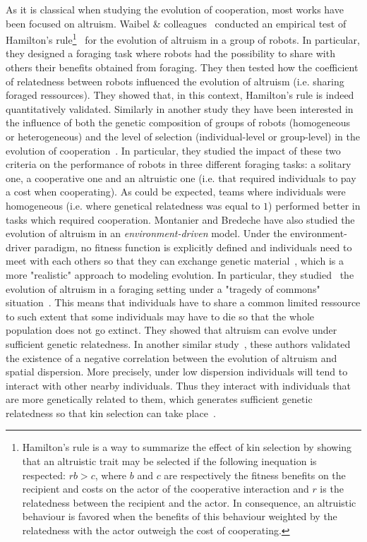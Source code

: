         As it is classical when studying the evolution of cooperation, most works have been focused on altruism. Waibel \& colleagues~\parencite{Waibel2011} conducted an empirical test of Hamilton's rule\footnote{Hamilton's rule is a way to summarize the effect of kin selection by showing that an altruistic trait may be selected if the following inequation is respected: $rb > c$, where $b$ and $c$ are respectively the fitness benefits on the recipient and costs on the actor of the cooperative interaction and $r$ is the relatedness between the recipient and the actor. In consequence, an altruistic behaviour is favored when the benefits of this behaviour weighted by the relatedness with the actor outweigh the cost of cooperating.}~\parencite{Hamilton1964} for the evolution of altruism in a group of robots. In particular, they designed a foraging task where robots had the possibility to share with others their benefits obtained from foraging. They then tested how the coefficient of relatedness between robots influenced the evolution of altruism (i.e. sharing foraged ressources). They showed that, in this context, Hamilton's rule is indeed quantitatively validated. Similarly in another study they have been interested in the influence of both the genetic composition of groups of robots (homogeneous or heterogeneous) and the level of selection (individual-level or group-level) in the evolution of cooperation~\parencite{Waibel2009}. In particular, they studied the impact of these two criteria on the performance of robots in three different foraging tasks: a solitary one, a cooperative one and an altruistic one (i.e. that required individuals to pay a cost when cooperating). As could be expected, teams where individuals were homogeneous (i.e. where genetical relatedness was equal to $1$) performed better in tasks which required cooperation. Montanier and Bredeche have also studied the evolution of altruism in an \emph{environment-driven} model. Under the environment-driver paradigm, no fitness function is explicitly defined and individuals need to meet with each others so that they can exchange genetic material~\parencite{Bredeche2010}, which is a more "realistic" approach to modeling evolution. In particular, they studied~\parencite{Montanier2011} the evolution of altruism in a foraging setting under a "tragedy of commons" situation~\parencite{Hardin1968}. This means that individuals have to share a common limited ressource to such extent that some individuals may have to die so that the whole population does not go extinct. They showed that altruism can evolve under sufficient genetic relatedness. In another similar study~\parencite{Montanier2013}, these authors validated the existence of a negative correlation between the evolution of altruism and spatial dispersion. More precisely, under low dispersion individuals will tend to interact with other nearby individuals. Thus they interact with individuals that are more genetically related to them, which generates sufficient genetic relatedness so that kin selection can take place~\parencite{VanBaalen1998}. 

